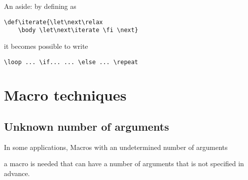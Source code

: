 \documentclass[letterpaper]{book}
\begin{document}
An aside: by defining  as
\begin{verbatim}
\def\iterate{\let\next\relax 
    \body \let\next\iterate \fi \next}
\end{verbatim}
it becomes possible to write
\begin{verbatim}
\loop ... \if... ... \else ... \repeat
\end{verbatim}

\section{Macro techniques}

\subsection{Unknown number of arguments}

In some applications,
\howto  Macros with an undetermined number
of arguments\par
a macro is needed that can have a
number of arguments that is not specified in advance.
\end{document}
